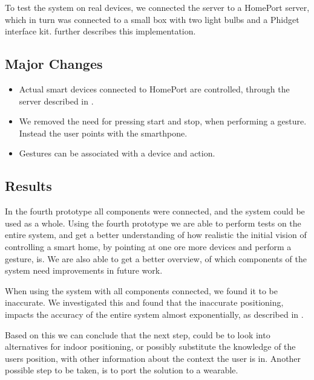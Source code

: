 To test the system on real devices, 
we connected the server to a HomePort server,
which in turn was connected to a small box with two light bulbs and a Phidget interface kit. 
 further describes this implementation. 

\subsection{Major Changes}

\begin{itemize}
\item Actual smart devices connected to HomePort are controlled, through the server described in .
\item We removed the need for pressing start and stop, when performing a gesture. Instead the user points with the smarthpone.
\item Gestures can be associated with a device and action.
\end{itemize}

\subsection{Results}

In the fourth prototype all components were connected, 
and the system could be used as a whole. 
Using the fourth prototype we are able to perform tests on the entire system, 
and get a better understanding of how realistic the initial vision of controlling a smart home, 
by pointing at one ore more devices and perform a gesture, is. 
We are also able to get a better overview, 
of which components of the system need improvements in future work.

When using the system with all components connected, 
we found it to be inaccurate. 
We investigated this and found that the inaccurate positioning, 
impacts the accuracy of the entire system almost exponentially, 
as described in .

Based on this we can conclude that the next step, 
could be to look into alternatives for indoor positioning, 
or possibly substitute the knowledge of the users position, 
with other information about the context the user is in.
Another possible step to be taken, 
is to port the solution to a wearable.

